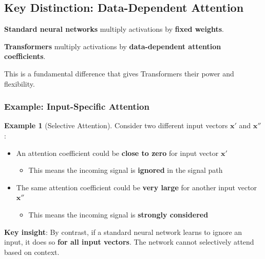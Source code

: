 \documentclass[11pt,a4paper]{article}
\theoremstyle{definition}
\newtheorem{example}{Example}[section]
\theoremstyle{plain}
\theoremstyle{remark}
\begin{document}
\subsection{Key Distinction: Data-Dependent Attention}

\begin{tcolorbox}[colback=red!10!white,colframe=red!75!black,title=\textbf{Important Notice}]
\textbf{Standard neural networks} multiply activations by \textbf{fixed weights}.

\textbf{Transformers} multiply activations by \textbf{data-dependent attention coefficients}.

This is a fundamental difference that gives Transformers their power and flexibility.
\end{tcolorbox}

\subsubsection{Example: Input-Specific Attention}

\begin{example}[Selective Attention]
Consider two different input vectors $\mathbf{x}'$ and $\mathbf{x}''$:

\begin{itemize}
    \item An attention coefficient could be \textbf{close to zero} for input vector $\mathbf{x}'$
    \begin{itemize}
        \item This means the incoming signal is \textbf{ignored} in the signal path
    \end{itemize}
    
    \item The same attention coefficient could be \textbf{very large} for another input vector $\mathbf{x}''$
    \begin{itemize}
        \item This means the incoming signal is \textbf{strongly considered}
    \end{itemize}
\end{itemize}

\textbf{Key insight}: By contrast, if a standard neural network learns to ignore an input, it does so \textbf{for all input vectors}. The network cannot selectively attend based on context.
\end{example}
\end{document}
